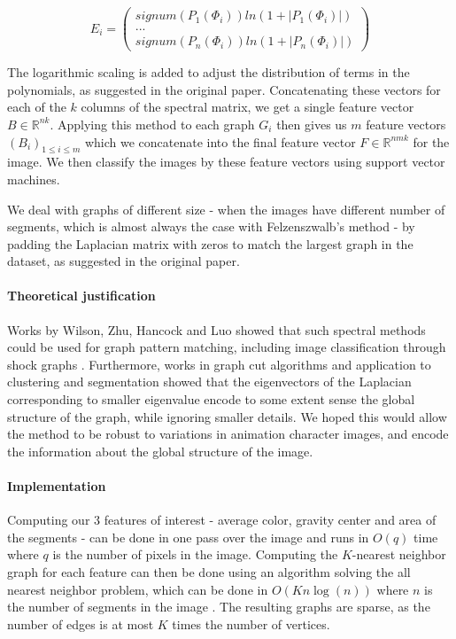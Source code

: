 \[
E_i = \begin{pmatrix}
signum(P_1(\Phi_i)) ln(1 + |P_1(\Phi_i)|) \\
... \\
signum(P_n(\Phi_i)) ln(1 + |P_n(\Phi_i)|)
\end{pmatrix}
\] 

The logarithmic scaling is added to adjust the distribution of terms in the polynomials, as suggested in the original paper. Concatenating these vectors for each of the $k$ columns of the spectral matrix, we get a single feature vector $B \in \mathbb{R}^{nk}$. Applying this method to each graph $G_i$ then gives us $m$ feature vectors $(B_i)_{1 \leq i \leq m}$ which we concatenate into the final feature vector $F \in \mathbb{R}^{nmk}$ for the image. We then classify the images by these feature vectors using support vector machines.

We deal with graphs of different size - when the images have different number of segments, which is almost always the case with Felzenszwalb's method - by padding the Laplacian matrix with zeros to match the largest graph in the dataset, as suggested in the original paper.

\paragraph{Theoretical justification}
Works by Wilson, Zhu, Hancock and Luo showed that such spectral methods could be used for graph pattern matching, including image classification through shock graphs \cite{wilson2005pattern}\cite{wilson2008study}. Furthermore, works in graph cut algorithms and application to clustering \cite{ng2002spectral} and segmentation\cite{shi2000normalized}\cite{meila2001random} showed that the eigenvectors of the Laplacian corresponding to smaller eigenvalue encode to some extent sense the global structure of the graph, while ignoring smaller details. We hoped this would allow the method to be robust to variations in animation character images, and encode the information about the global structure of the image.

\paragraph{Implementation}
Computing our $3$ features of interest - average color, gravity center and area of the segments - can be done in one pass over the image and runs in $O(q)$ time where $q$ is the number of pixels in the image. Computing the $K$-nearest neighbor graph for each feature can then be done using an algorithm solving the all nearest neighbor problem, which can be done in $O(Kn\log(n))$ where $n$ is the number of segments in the image \cite{clarkson1983fast}. The resulting graphs are sparse, as the number of edges is at most $K$ times the number of vertices.

